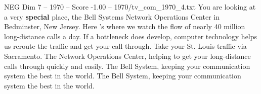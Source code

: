 \begin{textsample}{NEG Dim 7 – 1970 – Score -1.00 – 1970/tv\_com\_1970\_4.txt}  \label{ex:f7_neg_063}
You are looking at a very \textbf{special} place, the Bell Systems Network Operations Center in Bedminster, New Jersey.
Here 's where we watch the flow of nearly 40 million long-distance calls a day.
If a bottleneck does develop, computer technology helps us reroute the traffic and get your call through.
Take your St.
Louis traffic via Sacramento.
The Network Operations Center, helping to get your long-distance calls through quickly and easily.
The Bell System, keeping your communication system the best in the world.
The Bell System, keeping your communication system the best in the world.

\end{textsample}
